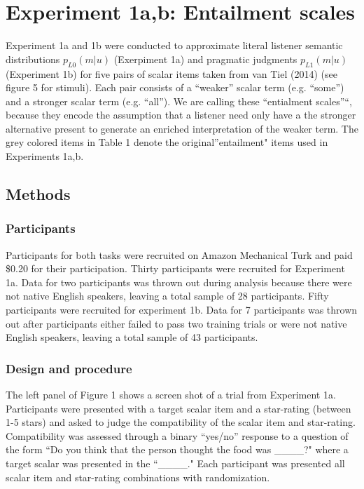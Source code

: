 \documentclass[10pt, letterpaper]{article}
\begin{document}
\section{Experiment 1a,b: Entailment
scales}\label{experiment-1ab-entailment-scales}

Experiment 1a and 1b were conducted to approximate literal listener
semantic distributions \(p_{L0}(m|u)\) (Exerpiment 1a) and pragmatic
judgments \(p_{L1}(m|u)\) (Experiment 1b) for five pairs of scalar items
taken from van Tiel (2014) (see figure 5 for stimuli). Each pair
consists of a ``weaker'' scalar term (e.g. ``some'') and a stronger
scalar term (e.g. ``all''). We are calling these ``entialment
scales''``, because they encode the assumption that a listener need only
have a the stronger alternative present to generate an enriched
interpretation of the weaker term. The grey colored items in Table 1
denote the original''entailment" items used in Experiments 1a,b.

\subsection{Methods}\label{methods}

\subsubsection{Participants}\label{participants}

Participants for both tasks were recruited on Amazon Mechanical Turk and
paid \$0.20 for their participation. Thirty participants were recruited
for Experiment 1a. Data for two participants was thrown out during
analysis because there were not native English speakers, leaving a total
sample of 28 participants. Fifty participants were recruited for
experiment 1b. Data for 7 participants was thrown out after participants
either failed to pass two training trials or were not native English
speakers, leaving a total sample of 43 participants.

\subsubsection{Design and procedure}\label{design-and-procedure}

The left panel of Figure 1 shows a screen shot of a trial from
Experiment 1a. Participants were presented with a target scalar item and
a star-rating (between 1-5 stars) and asked to judge the compatibility
of the scalar item and star-rating. Compatibility was assessed through a
binary ``yes/no'' response to a question of the form ``Do you think that
the person thought the food was \_\_\_\_?" where a target scalar was
presented in the ``\_\_\_\_." Each participant was presented all scalar
item and star-rating combinations with randomization.
\end{document}
